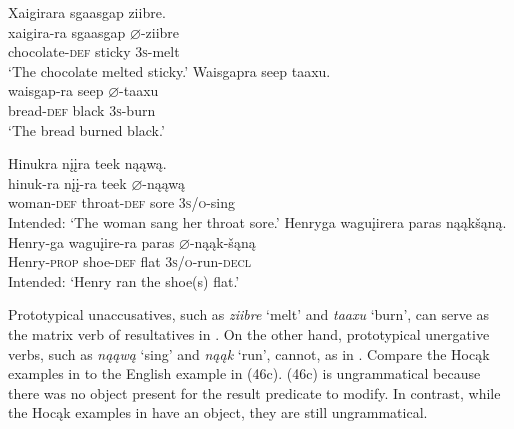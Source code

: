 \documentclass[output=paper]{LSP/langsci}
\begin{document}
\begin{exe}
\ex\label{ex:jrs:48}
\begin{xlist}
\ex     
\glll Xaigirara			sgaasgap		ziibre.\\
xaigira-ra			sgaasgap		$\varnothing$-ziibre \\
	chocolate-\textsc{def}	sticky			\textsc{3s}-melt \\
\trans `The chocolate melted sticky.'
\ex  
\glll Waisgapra		seep		taaxu.\\
waisgap-ra		seep		$\varnothing$-taaxu \\
	bread-\textsc{def}		black		\textsc{3s}-burn \\
\trans `The bread burned black.'
\end{xlist}
\end{exe}
\begin{exe}
\ex\label{ex:jrs:49}
\begin{xlist}
\ex   
\glll *Hinukra			n\k{i}\k{i}ra				teek	nąąwą.\\
hinuk-ra			n\k{i}\k{i}-ra				teek	$\varnothing$-nąąwą \\
		woman-\textsc{def}	 throat-\textsc{def}	sore	\textsc{3s/o}-sing \\
\trans Intended: `The woman sang her throat sore.'
\ex\label{ex:jrs:} 
\glll *Henryga			wagu\k{i}irera		paras		nąąk\v{s}ąną.\\
Henry-ga		wagu\k{i}ire-ra	paras		$\varnothing$-nąąk-\v{s}ąną \\
		Henry-\textsc{prop}	shoe-\textsc{def}			flat			\textsc{3s/o}-run-\textsc{decl} \\
\trans Intended: `Henry ran the shoe(s) flat.'
\end{xlist}
\end{exe}

Prototypical unaccusatives, such as \textit{ziibre} `melt' and \textit{taaxu} `burn', can serve as the matrix verb of resultatives in . On the other hand, prototypical unergative verbs, such as \textit{nąąwą} `sing' and \textit{nąąk} `run', cannot, as in . Compare the Hocąk examples in  to the English example in (46c). (46c) is ungrammatical because there was no object present for the result predicate to modify. In contrast, while the Hocąk examples in  have an object, they are still ungrammatical.
	
\end{document}
